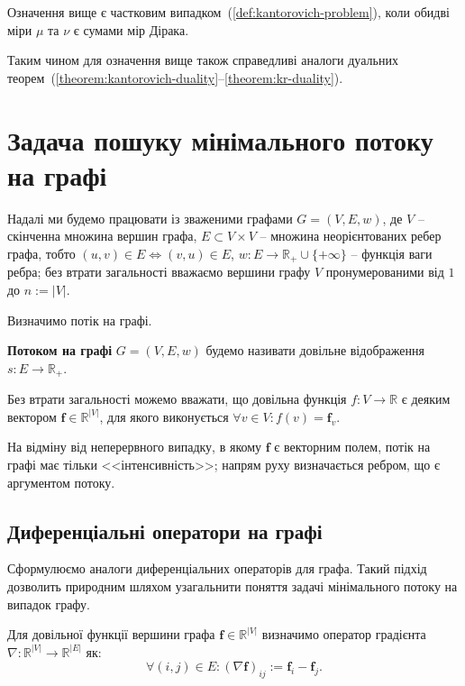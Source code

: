Означення вище є частковим випадком~(\ref{def:kantorovich-problem}), коли обидві міри $\mu$ та $\nu$ є
сумами мір Дірака.

Таким чином для означення вище також справедливі аналоги дуальних теорем~(\ref{theorem:kantorovich-duality}--\ref{theorem:kr-duality}).

\section{Задача пошуку мінімального потоку на графі}

Надалі ми будемо працювати із зваженими графами $G = (V, E, w)$, де $V$ -- скінченна множина вершин графа,
$E \subset V \times V$ -- множина неорієнтованих ребер графа, тобто $(u, v) \in E \iff (v, u) \in E$, 
$w : E \to \mathbb{R}_+ \cup \{+\infty\}$ -- функція ваги ребра;
без втрати загальності вважаємо вершини графу $V$ пронумерованими від $1$ до $n := |V|$.

Визначимо потік на графі.
\begin{definition}
    \textbf{Потоком на графі} $G = (V, E, w)$ будемо називати довільне відображення $s : E \to \mathbb{R}_+$.
\end{definition}

Без втрати загальності можемо вважати, що довільна функція $f : V \to \mathbb{R}$ 
є деяким вектором $\mathbf{f} \in \mathbb{R}^{|V|}$, для якого виконується $\forall v \in V: f(v) = \mathbf{f}_v$.

На відміну від неперервного випадку, в якому $\mathbf{f}$ є векторним полем, потік на графі має тільки <<інтенсивність>>;
напрям руху визначається ребром, що є аргументом потоку.

\subsection{Диференціальні оператори на графі}
Сформулюємо аналоги диференціальних операторів для графа. Такий підхід дозволить природним шляхом узагальнити поняття
задачі мінімального потоку на випадок графу.

\begin{definition}
    \label{def:grad}
    Для довільної функції вершини графа $\mathbf f \in \mathbb{R}^{|V|}$ визначимо оператор градієнта
    $\nabla : \mathbb{R}^{|V|} \to \mathbb{R}^{|E|}$ як:
    $$
        \forall (i, j) \in E: (\nabla \mathbf f)_{ij} := \mathbf{f}_i - \mathbf{f}_j.
    $$
\end{definition}

